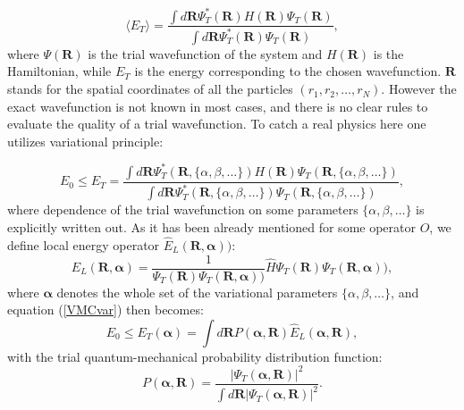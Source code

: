 \documentclass[twoside,english]{uiofysmaster}
\begin{document}
\begin{equation}\label{eq:energyinqm}
\langle E_T \rangle = \frac{\int d\boldsymbol{R}\Psi_T^{\ast}(\boldsymbol{R})H(\boldsymbol{R})\Psi_T(\boldsymbol{R})}
{\int d\boldsymbol{R}\Psi_T^{\ast}(\boldsymbol{R})\Psi_T(\boldsymbol{R})},
\end{equation}
where $\Psi(\boldsymbol{R})$ is the trial wavefunction of the system and $H(\boldsymbol{R})$ is the Hamiltonian, while $E_T$ is the energy corresponding to the chosen wavefunction. $\boldsymbol{R}$ stands for the spatial coordinates of all the particles $(r_1, r_2, \dots, r_N)$. However the exact wavefunction is not known in most cases, and there is no clear rules to evaluate the quality of a trial wavefunction. To catch a real physics here one utilizes variational principle:

\begin{equation}\label{VMCvar}
E_0 \leq E_T  =  \frac{\int d\boldsymbol{R}\Psi_T^{\ast}(\boldsymbol{R},\{\alpha, \beta, \dots\})H(\boldsymbol{R})\Psi_T(\boldsymbol{R},\{\alpha, \beta, \dots\})}
{\int d\boldsymbol{R}\Psi_T^{\ast}(\boldsymbol{R},\{\alpha, \beta, \dots\})\Psi_T(\boldsymbol{R},\{\alpha, \beta, \dots\})},
\end{equation}
where dependence of the trial wavefunction on some parameters $\{\alpha, \beta, \dots\}$ is explicitly written out. 
As it has been already mentioned for some operator $\hat{O}$, we define local energy operator $\hat{E}_L(\boldsymbol{R},\boldsymbol{\alpha}))$:
\begin{equation}
	\hat{E}_L(\boldsymbol{R},\boldsymbol{\alpha}) = \frac{1}{\Psi_T(\boldsymbol{R})\Psi_T(\boldsymbol{R},\boldsymbol{\alpha}))}\hat{H}\Psi_T(\boldsymbol{R})\Psi_T(\boldsymbol{R},\boldsymbol{\alpha})),
\end{equation}
where $\boldsymbol{\alpha}$ denotes the whole set of the variational parameters $\{\alpha, \beta, \dots\}$, and equation (\ref{VMCvar}) then becomes:
\begin{equation}\label{inttoeval}
E_0 \leq E_T(\boldsymbol{\alpha})  = \int d \boldsymbol{R} P(\boldsymbol{\alpha},\boldsymbol{R})  \hat{E}_L(\boldsymbol{\alpha},\boldsymbol{R}),
\end{equation}
with the trial quantum-mechanical probability distribution function:
\begin{equation}
P(\boldsymbol{\alpha},\boldsymbol{R}) = \frac{|\Psi_T(\boldsymbol{\alpha},\boldsymbol{R})|^2}{\int d\boldsymbol{R} |\Psi_T(\boldsymbol{\alpha},\boldsymbol{R})|^2}.
\end{equation}
\end{document}
